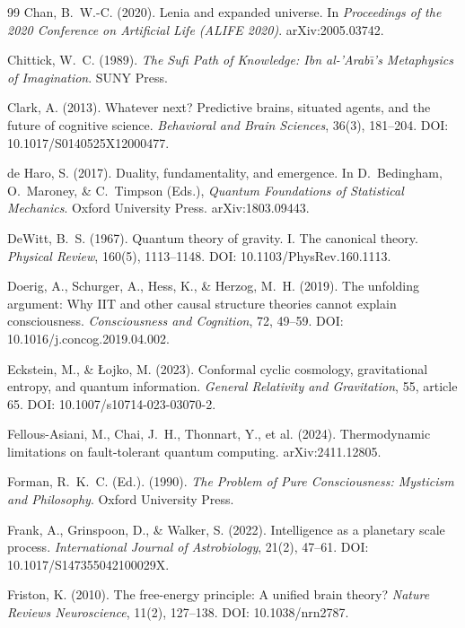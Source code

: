 \documentclass[12pt, a4paper]{article}
\begin{document}
\begin{thebibliography}{99}
Chan, B.~W.-C. (2020). Lenia and expanded universe. In \textit{Proceedings of the 2020
Conference on Artificial Life (ALIFE 2020)}. arXiv:2005.03742.

Chittick, W.~C. (1989). \textit{The Sufi Path of Knowledge: Ibn al-'Arab\={\i}'s Metaphysics
of Imagination}. SUNY Press.

Clark, A. (2013). Whatever next? Predictive brains, situated agents, and the future of
cognitive science. \textit{Behavioral and Brain Sciences}, 36(3), 181--204.
DOI: 10.1017/S0140525X12000477.

de Haro, S. (2017). Duality, fundamentality, and emergence. In D.~Bedingham, O.~Maroney,
\& C.~Timpson (Eds.), \textit{Quantum Foundations of Statistical Mechanics}. Oxford
University Press. arXiv:1803.09443.

DeWitt, B.~S. (1967). Quantum theory of gravity. I. The canonical theory. \textit{Physical
Review}, 160(5), 1113--1148. DOI: 10.1103/PhysRev.160.1113.

Doerig, A., Schurger, A., Hess, K., \& Herzog, M.~H. (2019). The unfolding argument:
Why IIT and other causal structure theories cannot explain consciousness. \textit{Consciousness
and Cognition}, 72, 49--59. DOI: 10.1016/j.concog.2019.04.002.

Eckstein, M., \& \L{}ojko, M. (2023). Conformal cyclic cosmology, gravitational entropy,
and quantum information. \textit{General Relativity and Gravitation}, 55, article 65.
DOI: 10.1007/s10714-023-03070-2.

Fellous-Asiani, M., Chai, J.~H., Thonnart, Y., et al. (2024). Thermodynamic limitations on
fault-tolerant quantum computing. arXiv:2411.12805.

Forman, R.~K.~C. (Ed.). (1990). \textit{The Problem of Pure Consciousness: Mysticism and
Philosophy}. Oxford University Press.

Frank, A., Grinspoon, D., \& Walker, S. (2022). Intelligence as a planetary scale process.
\textit{International Journal of Astrobiology}, 21(2), 47--61.
DOI: 10.1017/S147355042100029X.

Friston, K. (2010). The free-energy principle: A unified brain theory?
\textit{Nature Reviews Neuroscience}, 11(2), 127--138. DOI: 10.1038/nrn2787.


\end{thebibliography}
\end{document}
